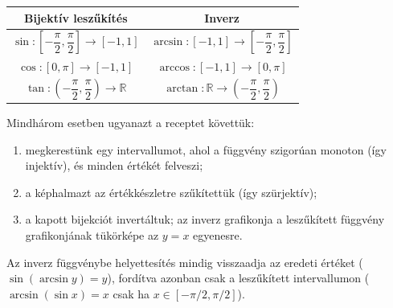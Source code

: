 \documentclass[11pt]{scrartcl}
\theoremstyle{definition}
\theoremstyle{remark}
\begin{document}
\begin{center}
	\renewcommand{\arraystretch}{1.7}
	\begin{tabular}{@{}cc@{}}
		\toprule
		Bijektív leszűkítés                                                    &
		Inverz                                                                    \\
		\midrule
		$\sin\colon \left[-\dfrac{\pi}{2}, \dfrac{\pi}{2}\right] \to [-1, 1]$    &
		$\arcsin\colon [-1, 1] \to \left[-\dfrac{\pi}{2}, \dfrac{\pi}{2}\right]$    \\
		$\cos\colon [0, \pi] \to [-1, 1]$                                      &
		$\arccos\colon [-1, 1] \to [0, \pi]$                                      \\
		$\tan\colon \left(-\dfrac{\pi}{2}, \dfrac{\pi}{2}\right) \to \mathbb{R}$ &
		$\arctan\colon \mathbb{R} \to \left(-\dfrac{\pi}{2}, \dfrac{\pi}{2}\right)$ \\
		\bottomrule
	\end{tabular}
\end{center}

Mindhárom esetben ugyanazt a receptet követtük:
\begin{enumerate}
	\item megkerestünk egy intervallumot, ahol a függvény szigorúan monoton
	      (így injektív), és minden értékét felveszi;
	\item a képhalmazt az értékkészletre szűkítettük (így szürjektív);
	\item a kapott bijekciót invertáltuk; az inverz grafikonja a leszűkített
	      függvény grafikonjának tükörképe az $y = x$ egyenesre.
\end{enumerate}
Az inverz függvénybe helyettesítés mindig visszaadja az eredeti értéket
($\sin(\arcsin y) = y$), fordítva azonban csak a leszűkített intervallumon
($\arcsin(\sin x) = x$ csak ha $x \in \left[-\pi/2,
		\pi/2\right]$).
\end{document}
